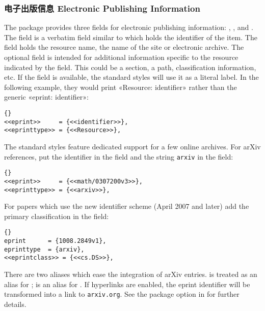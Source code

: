 \subsubsection{电子出版信息 Electronic Publishing Information}
\label{use:use:epr}

The \biblatex package provides three fields for electronic publishing information: , , and . The  field is a verbatim field similar to  which holds the identifier of the item. The  field holds the resource name, \ie the name of the site or electronic archive. The optional  field is intended for additional information specific to the resource indicated by the  field. This could be a section, a path, classification information, etc. If the  field is available, the standard styles will use it as a literal label. In the following example, they would print «Resource: identifier» rather than the generic «eprint: identifier»:

\begin{lstlisting}[style=bibtex]{}
<<eprint>>     = {<<identifier>>},
<<eprinttype>> = {<<Resource>>},
\end{lstlisting}
%
The standard styles feature dedicated support for a few online archives. For arXiv references, put the identifier in the  field and the string \texttt{arxiv} in the  field:

\begin{lstlisting}[style=bibtex]{}
<<eprint>>     = {<<math/0307200v3>>},
<<eprinttype>> = {<<arxiv>>},
\end{lstlisting}
%
For papers which use the new identifier scheme (April 2007 and later) add the primary classification in the  field:

\begin{lstlisting}[style=bibtex]{}
eprint      = {1008.2849v1},
eprinttype  = {arxiv},
<<eprintclass>> = {<<cs.DS>>},
\end{lstlisting}
%
There are two aliases which ease the integration of arXiv entries.  is treated as an alias for ;  is an alias for . If hyperlinks are enabled, the eprint identifier will be transformed into a link to \nolinkurl{arxiv.org}. See the package option  in  for further details.


